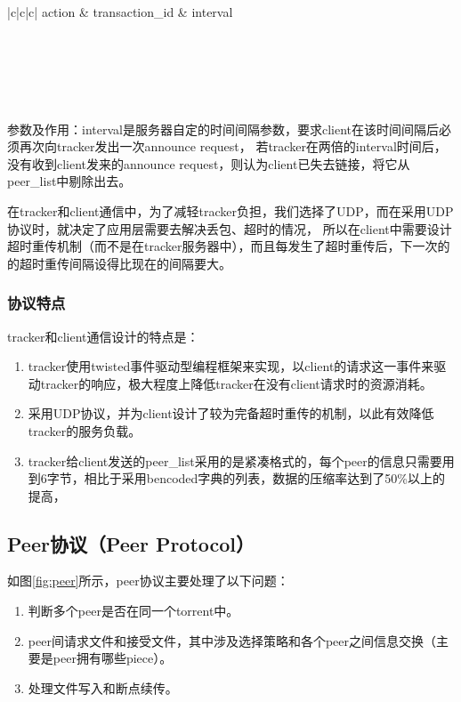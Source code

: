 \documentclass[15pt]{ctexart}
\begin{document}
			\begin{table}[H]
				\centering
				\begin{tabular}{|c|c|c|}
					\hline
					action & transaction\_id & interval \\
					\hline
					\\
					\\
					\\
					\\
					\\
					\hline
				\end{tabular}
				\caption{服务器announce response}
			\end{table}
			\par 参数及作用：interval是服务器自定的时间间隔参数，要求client在该时间间隔后必须再次向tracker发出一次announce request，
			若tracker在两倍的interval时间后，没有收到client发来的announce request，则认为client已失去链接，将它从peer\_list中剔除出去。
			\\
			\par 在tracker和client通信中，为了减轻tracker负担，我们选择了UDP，而在采用UDP协议时，就决定了应用层需要去解决丢包、超时的情况，
			所以在client中需要设计超时重传机制（而不是在tracker服务器中），而且每发生了超时重传后，下一次的的超时重传间隔设得比现在的间隔要大。
		\subsubsection{协议特点} %
		\label{ssub:协议特点}
			tracker和client通信设计的特点是：
			\begin{enumerate}
				\item tracker使用twisted事件驱动型编程框架来实现，以client的请求这一事件来驱动tracker的响应，极大程度上降低tracker在没有client请求时的资源消耗。
				\item 采用UDP协议，并为client设计了较为完备超时重传的机制，以此有效降低tracker的服务负载。
				\item tracker给client发送的peer\_list采用的是紧凑格式的，每个peer的信息只需要用到6字节，相比于采用bencoded字典的列表，数据的压缩率达到了50\%以上的提高，			
			\end{enumerate}		
	\subsection{Peer协议（Peer Protocol）} %
	\label{sub:peer}
		如图\ref{fig:peer}所示，peer协议主要处理了以下问题：
		\begin{enumerate}
			\item 判断多个peer是否在同一个torrent中。
			\item peer间请求文件和接受文件，其中涉及选择策略和各个peer之间信息交换（主要是peer拥有哪些piece）。
			\item 处理文件写入和断点续传。
		\end{enumerate}
\end{document}
